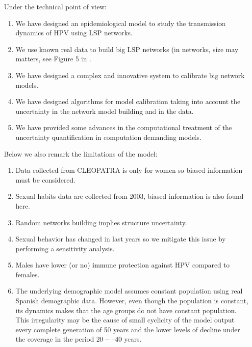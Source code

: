 Under the technical point of view:
\begin{enumerate}
	\item We have designed an epidemiological model to study the transmission dynamics of HPV using LSP networks.
	\item We use known real data to build big LSP networks (in networks, size may matters, see Figure 5 in \cite{villanueva2013epidemic}.
	\item We have designed a complex and innovative system to calibrate big network models.
	\item We have designed algorithms for model calibration taking into account the uncertainty in the network model building and in the data. 
	\item We have provided some advances in the computational treatment of the uncertainty quantification in computation demanding models.
\end{enumerate}

Below we also remark the limitations of the model:
\begin{enumerate}
	\item Data collected from CLEOPATRA is only for women so biased information must be considered.
	\item Sexual habits data are collected from 2003, biased information is also found here.
	\item Random networks building implies structure uncertainty.
	\item Sexual behavior has changed in last years so we mitigate this issue by performing a sensitivity analysis.
	\item Males have lower (or no) immune protection against HPV compared to females.
	\item The underlying demographic model assumes constant population using real Spanish demographic data. However, even though the population is constant, its dynamics makes that the age groups do not have constant population. This irregularity may be the cause of small cyclicity of the model output every complete generation of 50 years and the lower levels of decline under the coverage in the period $20-–40$ years.
\end{enumerate}
